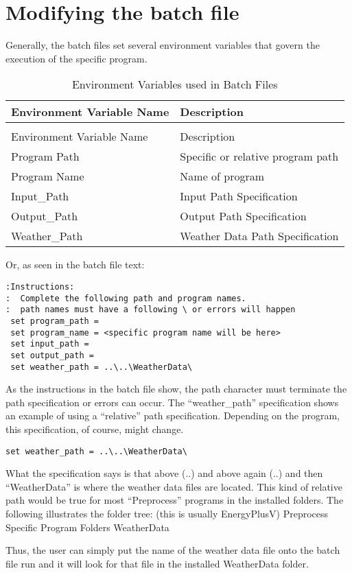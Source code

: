 \section{Modifying the batch file}\label{modifying-the-batch-file}

Generally, the batch files set several environment variables that govern the execution of the specific program.

\begin{longtable}[c]{@{}ll@{}}
\caption{Environment Variables used in Batch Files \label{table:environment-variables-used-in-batch-files}} \tabularnewline
\toprule 
Environment Variable Name & Description \tabularnewline
\midrule
\endfirsthead

\caption[]{Environment Variables used in Batch Files} \tabularnewline
\toprule 
Environment Variable Name & Description \tabularnewline
\midrule
\endhead

Program Path & Specific or relative program path \tabularnewline
Program Name & Name of program \tabularnewline
Input\_Path & Input Path Specification \tabularnewline
Output\_Path & Output Path Specification \tabularnewline
Weather\_Path & Weather Data Path Specification \tabularnewline
\bottomrule
\end{longtable}

Or, as seen in the batch file text:

\begin{lstlisting}
:Instructions:
:  Complete the following path and program names.
:  path names must have a following \ or errors will happen
 set program_path =
 set program_name = <specific program name will be here>
 set input_path =
 set output_path =
 set weather_path = ..\..\WeatherData\
\end{lstlisting}

As the instructions in the batch file show, the path character must terminate the path specification or errors can occur. The ``weather\_path'' specification shows an example of using a ``relative'' path specification. Depending on the program, this specification, of course, might change.

\begin{lstlisting}
set weather_path = ..\..\WeatherData\
\end{lstlisting}

What the specification says is that above (..) and above again (..) and then ``WeatherData'' is where the weather data files are located. This kind of relative path would be true for most ``Preprocess'' programs in the installed folders. The following illustrates the folder tree: (this is usually EnergyPlusV) Preprocess Specific Program Folders WeatherData

Thus, the user can simply put the name of the weather data file onto the batch file run and it will look for that file in the installed WeatherData folder.
